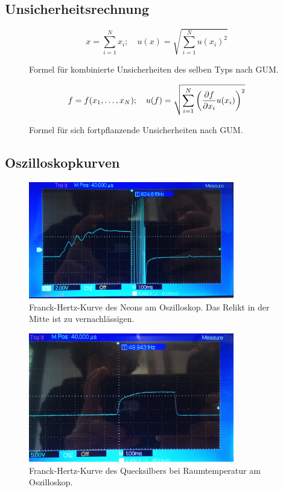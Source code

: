 \subsection{Unsicherheitsrechnung}\label{VGuD}

\begin{figure}[h]
	\begin{equation*}
		x = \sum_{i=1}^{N} x_i
		;\quad
		u(x) = \sqrt{\sum_{i = 1}^{N} u(x_i)^2}
	\end{equation*}
	\caption{Formel für kombinierte Unsicherheiten des selben Typs nach GUM.}
	\label{eq:GUM_combine}
\end{figure}

\begin{figure}[h]
	\begin{equation*}
		f = f(x_1, \dots , x_N)
		;\quad
		u(f) = \sqrt{\sum_{i = 1}^{N}\left(\pdv{f}{x_i} u(x_i)\right) ^2}
	\end{equation*}
	\caption{Formel für sich fortpflanzende Unsicherheiten nach GUM.}
	\label{eq:GUM_formula}
\end{figure}

\subsection{Oszilloskopkurven}

\begin{figure}[ht]
	\centering
	\includegraphics[width=0.8\textwidth]{bilder/ne.jpg}
	\caption{Franck-Hertz-Kurve des Neons am Oszilloskop. Das Relikt in der Mitte ist zu vernachlässigen.}
	\label{fig:kurveNe}	
\end{figure}

\begin{figure}[ht]
	\centering
	\includegraphics[width=0.8\textwidth]{bilder/hgl.jpg}
	\caption{Franck-Hertz-Kurve des Quecksilbers bei Raumtemperatur am Oszilloskop.}
	\label{fig:kurveHgl}	
\end{figure}

